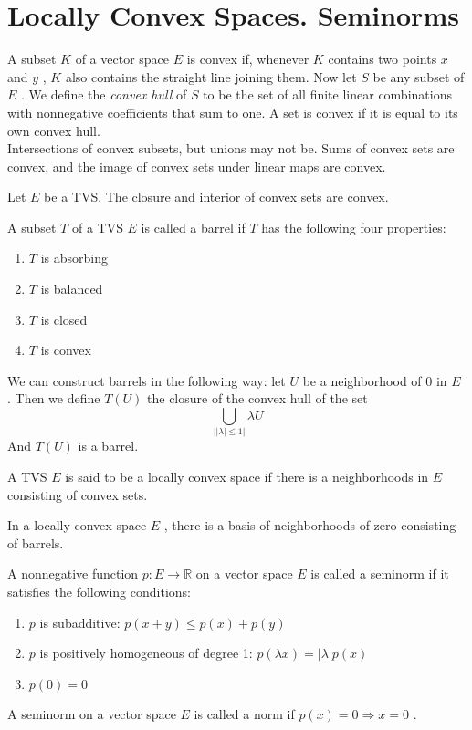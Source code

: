 \section{Locally Convex Spaces. Seminorms}

A subset $ K $ of a vector space $ E $ is convex if, whenever $ K $ contains two points $ x $ and $ y $ , $ K $ also contains the straight line joining them. Now let $ S $ be any subset of $ E $ . We define the \textit{convex hull} of $ S $ to be the set of all finite linear combinations with nonnegative coefficients that sum to one. A set is convex if it is equal to its own convex hull. \\
\indent Intersections of convex subsets, but unions may not be. Sums of convex sets are convex, and the image of convex sets under linear maps are convex. \\

\begin{prop}
	Let $ E $ be a TVS. The closure and interior of convex sets are convex.
\end{prop}

\begin{defn}
	A subset $ T $ of a TVS $ E $ is called a barrel if $ T $ has the following four properties:
	\begin{enumerate}
		\item $ T $ is absorbing
		\item $ T $ is balanced
		\item $ T $ is closed
		\item $ T $ is convex
	\end{enumerate}
	We can construct barrels in the following way: let $ U $ be a neighborhood of 0 in $ E $ . Then we define $ T(U) $ the closure of the convex hull of the set 
	\[
	\bigcup_{ \vert \vert \lambda \vert \leq 1 \vert } \lambda U
	\]
	And $ T(U) $ is a barrel.
\end{defn}

\begin{defn}
	A TVS $ E $ is said to be a locally convex space if there is a neighborhoods in $ E $ consisting of convex sets.
\end{defn}

\begin{prop}
	In a locally convex space $ E $ , there is a basis of neighborhoods of zero consisting of barrels.
\end{prop}

\begin{defn}
	A nonnegative function $ p: E \to \mathbb{R} $ on a vector space $ E $ is called a seminorm if it satisfies the following conditions:
	\begin{enumerate}
		\item $ p $ is subadditive: $ p(x+y) \leq p(x) + p(y) $ 
		\item $ p $ is positively homogeneous of degree 1: $ p( \lambda x) = \vert \lambda \vert p(x) $ 
		\item $ p(0) = 0 $ 
	\end{enumerate}
	A seminorm on a vector space $ E $ is called a norm if $ p(x) = 0 \Rightarrow x=0 $ .
\end{defn}

